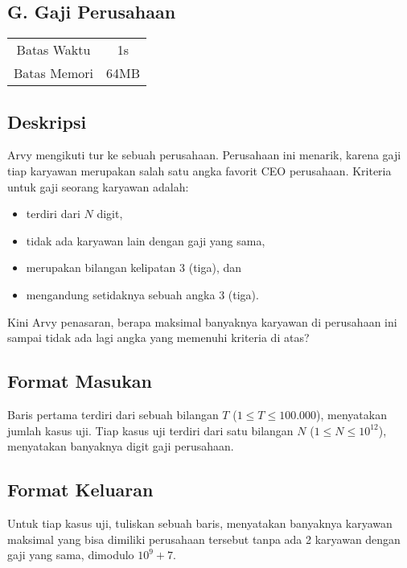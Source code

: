 \documentclass{article}
\begin{document}
\begin{center}
    \section*{G. Gaji Perusahaan} %

    \begin{tabular}{ | c c | }
        \hline
        Batas Waktu  & 1s \\    %
        Batas Memori & 64MB \\  %
        \hline
    \end{tabular}
\end{center}

\subsection*{Deskripsi}

Arvy mengikuti tur ke sebuah perusahaan.
Perusahaan ini menarik, karena gaji tiap karyawan merupakan salah satu angka favorit CEO perusahaan.
Kriteria untuk gaji seorang karyawan adalah:
\begin{itemize}
    \item terdiri dari $N$ digit,
    \item tidak ada karyawan lain dengan gaji yang sama,
    \item merupakan bilangan kelipatan 3 (tiga), dan
    \item mengandung setidaknya sebuah angka 3 (tiga).
\end{itemize}
Kini Arvy penasaran, berapa maksimal banyaknya karyawan di perusahaan ini sampai tidak ada lagi angka yang memenuhi kriteria di atas?

\subsection*{Format Masukan}

Baris pertama terdiri dari sebuah bilangan $T$ ($1 \leq T \leq 100.000$), menyatakan jumlah kasus uji.
Tiap kasus uji terdiri dari satu bilangan $N$ ($1 \leq N \leq 10^{12}$), menyatakan banyaknya digit gaji perusahaan.

\subsection*{Format Keluaran}

Untuk tiap kasus uji, tuliskan sebuah baris, menyatakan banyaknya karyawan maksimal yang bisa dimiliki perusahaan tersebut tanpa ada 2 karyawan dengan gaji yang sama, dimodulo ${10}^9+7$.
\\
\end{document}

